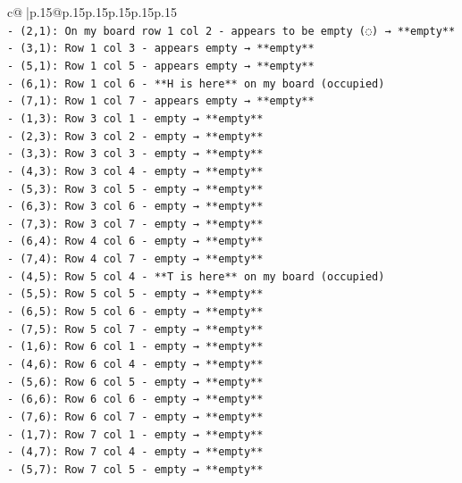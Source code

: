 \documentclass{article}
\begin{document}
{\begin{supertabular}{c@{$\;$}|p{.15\linewidth}@{}p{.15\linewidth}p{.15\linewidth}p{.15\linewidth}p{.15\linewidth}p{.15\linewidth}}
{{{\\ 
\texttt{{-} (2,1): On my board row 1 col 2 {-} appears to be empty (◌) → **empty**} \\
\texttt{{-} (3,1): Row 1 col 3 {-} appears empty → **empty**} \\
\texttt{{-} (5,1): Row 1 col 5 {-} appears empty → **empty**} \\
\texttt{{-} (6,1): Row 1 col 6 {-} **H is here** on my board (occupied)} \\
\texttt{{-} (7,1): Row 1 col 7 {-} appears empty → **empty**} \\
\texttt{{-} (1,3): Row 3 col 1 {-} empty → **empty**} \\
\texttt{{-} (2,3): Row 3 col 2 {-} empty → **empty**} \\
\texttt{{-} (3,3): Row 3 col 3 {-} empty → **empty**} \\
\texttt{{-} (4,3): Row 3 col 4 {-} empty → **empty**} \\
\texttt{{-} (5,3): Row 3 col 5 {-} empty → **empty**} \\
\texttt{{-} (6,3): Row 3 col 6 {-} empty → **empty**} \\
\texttt{{-} (7,3): Row 3 col 7 {-} empty → **empty**} \\
\texttt{{-} (6,4): Row 4 col 6 {-} empty → **empty**} \\
\texttt{{-} (7,4): Row 4 col 7 {-} empty → **empty**} \\
\texttt{{-} (4,5): Row 5 col 4 {-} **T is here** on my board (occupied)} \\
\texttt{{-} (5,5): Row 5 col 5 {-} empty → **empty**} \\
\texttt{{-} (6,5): Row 5 col 6 {-} empty → **empty**} \\
\texttt{{-} (7,5): Row 5 col 7 {-} empty → **empty**} \\
\texttt{{-} (1,6): Row 6 col 1 {-} empty → **empty**} \\
\texttt{{-} (4,6): Row 6 col 4 {-} empty → **empty**} \\
\texttt{{-} (5,6): Row 6 col 5 {-} empty → **empty**} \\
\texttt{{-} (6,6): Row 6 col 6 {-} empty → **empty**} \\
\texttt{{-} (7,6): Row 6 col 7 {-} empty → **empty**} \\
\texttt{{-} (1,7): Row 7 col 1 {-} empty → **empty**} \\
\texttt{{-} (4,7): Row 7 col 4 {-} empty → **empty**} \\
\texttt{{-} (5,7): Row 7 col 5 {-} empty → **empty**} \\
}}}
\end{supertabular}}
\end{document}
